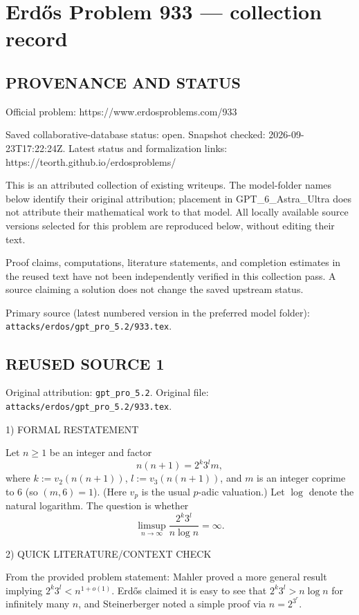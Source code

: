 \section*{Erd\H{o}s Problem 933 --- collection record}

\subsection*{PROVENANCE AND STATUS}
Official problem: https://www.erdosproblems.com/933

Saved collaborative-database status: open.
Snapshot checked: 2026-09-23T17:22:24Z.
Latest status and formalization links: https://teorth.github.io/erdosproblems/

This is an attributed collection of existing writeups. The model-folder names below identify their original attribution; placement in GPT\_6\_Astra\_Ultra does not attribute their mathematical work to that model. All locally available source versions selected for this problem are reproduced below, without editing their text.

Proof claims, computations, literature statements, and completion estimates in the reused text have not been independently verified in this collection pass. A source claiming a solution does not change the saved upstream status.

Primary source (latest numbered version in the preferred model folder): \texttt{attacks/erdos/gpt\_pro\_5.2/933.tex}.

\subsection*{REUSED SOURCE 1}
Original attribution: \texttt{gpt\_pro\_5.2}.
Original file: \texttt{attacks/erdos/gpt\_pro\_5.2/933.tex}.


1) FORMAL RESTATEMENT

Let $n\ge 1$ be an integer and factor
\[
 n(n+1)=2^k3^l m,
\]
where $k:=v_2(n(n+1))$, $l:=v_3(n(n+1))$, and $m$ is an integer coprime to $6$ (so $(m,6)=1$).
(Here $v_p$ is the usual $p$-adic valuation.)
Let $\log$ denote the natural logarithm.
The question is whether
\[
\limsup_{n\to\infty} \frac{2^k3^l}{n\log n}=\infty.
\]

2) QUICK LITERATURE/CONTEXT CHECK

From the provided problem statement: Mahler proved a more general result implying $2^k3^l<n^{1+o(1)}$. Erd\H{o}s claimed it is easy to see that $2^k3^l>n\log n$ for infinitely many $n$, and Steinerberger noted a simple proof via $n=2^{3^r}$.

